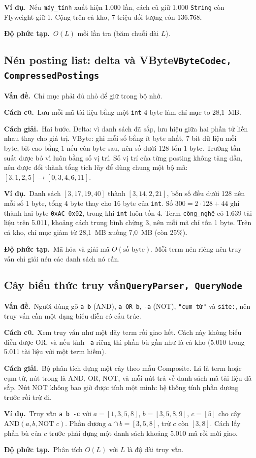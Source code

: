 \documentclass[9pt,twocolumn,a4paper]{extarticle}
\newcommand{\code}[1]{\texttt{#1}}
\newcommand{\dsa}[2]{\subsection[#1]{#1\hfill{\normalfont\footnotesize\code{#2}}}}
\newcommand{\vande}{\textcolor{linkblue}{\textbf{Vấn đề.}}~}
\newcommand{\cachgiai}{\textcolor{linkblue}{\textbf{Cách giải.}}~}
\newcommand{\dpt}{\textcolor{linkblue}{\textbf{Độ phức tạp.}}~}
\newcommand{\cu}{\textcolor{linkblue}{\textbf{Cách cũ.}}~}
\newcommand{\vidu}{\textcolor{linkblue}{\textbf{Ví dụ.}}~}
\begin{document}
\vidu Nếu \code{máy\_tính} xuất hiện 1.000 lần, cách cũ giữ 1.000 \code{String} còn Flyweight giữ 1. Cộng trên cả kho, 7 triệu đối tượng còn 136.768.

\dpt $O(L)$ mỗi lần tra (băm chuỗi dài $L$).

\dsa{Nén posting list: delta và VByte}{VByteCodec, CompressedPostings}
\vande Chỉ mục phải đủ nhỏ để giữ trong bộ nhớ.

\cu Lưu mỗi mã tài liệu bằng một \code{int} 4 byte làm chỉ mục to 28,1~MB.

\cachgiai Hai bước. Delta: vì danh sách đã sắp, lưu hiệu giữa hai phần tử liền nhau thay cho giá trị. VByte: ghi mỗi số bằng ít byte nhất, 7 bit dữ liệu mỗi byte, bit cao bằng 1 nếu còn byte sau, nên số dưới 128 tốn 1 byte. Trường tần suất được bỏ vì luôn bằng số vị trí. Số vị trí của từng posting không tăng dần, nên được đổi thành tổng tích lũy để dùng chung một bộ mã: $[3,1,2,5]\to[0,3,4,6,11]$.

\vidu Danh sách $[3,17,19,40]$ thành $[3,14,2,21]$, bốn số đều dưới 128 nên mỗi số 1 byte, tổng 4 byte thay cho 16 byte của \code{int}. Số $300=2\cdot128+44$ ghi thành hai byte \code{0xAC 0x02}, trong khi \code{int} luôn tốn 4. Term \code{công\_nghệ} có 1.639 tài liệu trên 5.011, khoảng cách trung bình chừng 3, nên mỗi mã chỉ tốn 1 byte. Trên cả kho, chỉ mục giảm từ 28,1~MB xuống 7,0~MB (còn 25\%).

\dpt Mã hóa và giải mã $O(\text{số byte})$. Mỗi term nén riêng nên truy vấn chỉ giải nén các danh sách nó cần.
\dsa{Cây biểu thức truy vấn}{QueryParser, QueryNode}
\vande Người dùng gõ \code{a b} (AND), \code{a OR b}, \code{-a} (NOT), \code{"cụm từ"} và \code{site:}, nên truy vấn cần một dạng biểu diễn có cấu trúc.

\cu Xem truy vấn như một dãy term rồi giao hết. Cách này không biểu diễn được OR, và nếu tính \code{-a} riêng thì phần bù gần như là cả kho (5.010 trong 5.011 tài liệu với một term hiếm).

\cachgiai Bộ phân tích dựng một cây theo mẫu Composite. Lá là term hoặc cụm từ, nút trong là AND, OR, NOT, và mỗi nút trả về danh sách mã tài liệu đã sắp. Nút NOT không bao giờ được tính một mình: hệ thống tính phần dương trước rồi trừ đi.

\vidu Truy vấn \code{a b -c} với $a=[1,3,5,8]$, $b=[3,5,8,9]$, $c=[5]$ cho cây AND$(a,b,\text{NOT }c)$. Phần dương $a\cap b=[3,5,8]$, trừ $c$ còn $[3,8]$. Cách lấy phần bù của $c$ trước phải dựng một danh sách khoảng 5.010 mã rồi mới giao.

\dpt Phân tích $O(L)$ với $L$ là độ dài truy vấn.
\end{document}
